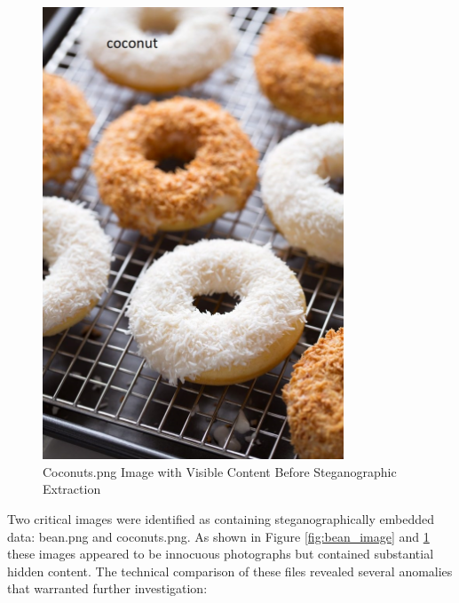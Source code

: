 \begin{figure}[h]
    \centering
    \includegraphics[width=0.8\textwidth]{images/Artifact and Evidence Recovery/coconuts_recipe.png}
    \caption{Coconuts.png Image with Visible Content Before Steganographic Extraction}
    \label{fig:coconuts_image}
\end{figure}

Two critical images were identified as containing steganographically embedded data: bean.png and coconuts.png. As shown in Figure \ref{fig:bean_image} and \ref{fig:coconuts_image} these images appeared to be innocuous photographs but contained substantial hidden content. The technical comparison of these files revealed several anomalies that warranted further investigation:

